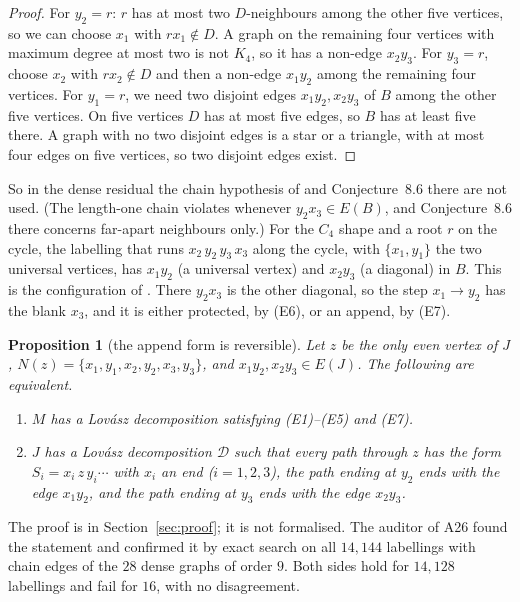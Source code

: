 \documentclass[11pt]{amsart}
\newtheorem{proposition}[theorem]{Proposition}
\theoremstyle{definition}
\newcommand{\cD}{\mathcal D}
\begin{document}
\begin{proof}
For $y_2=r$: $r$ has at most two $D$-neighbours among the other five vertices, so we can choose
$x_1$ with $rx_1\notin D$. A graph on the remaining four vertices with maximum degree at most two
is not $K_4$, so it has a non-edge $x_2y_3$. For $y_3=r$, choose $x_2$ with $rx_2\notin D$ and
then a non-edge $x_1y_2$ among the remaining four vertices. For $y_1=r$, we need two disjoint edges $x_1y_2,x_2y_3$ of
$B$ among the other five vertices. On five vertices $D$ has at most five edges, so $B$ has at least
five there. A graph with no two disjoint edges is a star or a triangle, with at most four edges on
five vertices, so two disjoint edges exist.
\end{proof}

So in the dense residual the chain hypothesis of \cite[Def.~8.1]{TM} and Conjecture~8.6 there
are not used. (The length-one chain violates \cite[Def.~8.1(ii)]{TM} whenever $y_2x_3\in E(B)$,
and Conjecture~8.6 there concerns far-apart neighbours only.) For the $C_4$ shape and a root $r$ on the cycle, the labelling that runs
$x_2\,y_2\,y_3\,x_3$ along the cycle, with $\{x_1,y_1\}$ the two universal vertices, has
$x_1y_2$ (a universal vertex) and $x_2y_3$ (a diagonal) in $B$. This is the configuration of
\cite[\S9(1)]{TM}. There $y_2x_3$ is the other diagonal, so the step $x_1\to y_2$ has the blank
$x_3$, and it is either protected, by (E6), or an append, by (E7).

\begin{proposition}[the append form is reversible]\label{prop:converse}
Let $z$ be the only even vertex of $J$, $N(z)=\{x_1,y_1,x_2,y_2,x_3,y_3\}$, and
$x_1y_2,x_2y_3\in E(J)$. The following are equivalent.
\begin{enumerate}[label=\textup{(\alph*)}]
\item $M$ has a Lov\'asz decomposition satisfying \textup{(E1)}--\textup{(E5)} and
\textup{(E7)}.
\item $J$ has a Lov\'asz decomposition $\cD$ such that every path through $z$ has the form
$S_i=x_i\,z\,y_i\cdots$ with $x_i$ an end ($i=1,2,3$), the path ending at $y_2$ ends with the edge
$x_1y_2$, and the path ending at $y_3$ ends with the edge $x_2y_3$.
\end{enumerate}
\end{proposition}

The proof is in Section~\ref{sec:proof}; it is not formalised. The auditor of A26 found the
statement and confirmed it by exact search on all $14{,}144$ labellings with chain edges of the
$28$ dense graphs of order $9$. Both sides hold for $14{,}128$ labellings and fail for $16$, with no
disagreement.
\end{document}
